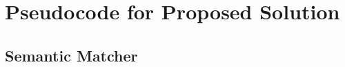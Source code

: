 \pagestyle{plain}

\hypersetup{linkcolor=blue}

\renewcommand\arraystretch{1.5}

\renewcommand{\bibsection}{\chapter*{\bibname}}




\appendix

\chapter{Pseudocode for Proposed Solution}
\section{Semantic Matcher}
